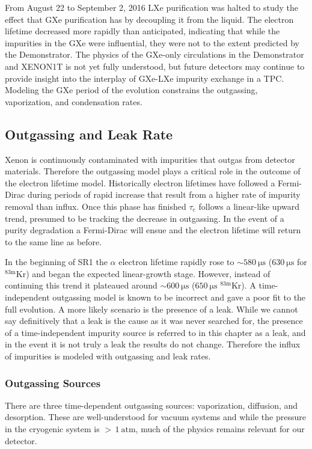From August 22 to September 2, 2016 LXe purification was halted to study the effect that GXe purification has by
decoupling it from the liquid.  The electron lifetime decreased more rapidly than anticipated, indicating that while the
impurities in the GXe were influential, they were not to the extent predicted by the Demonstrator.  The physics of the GXe-only
circulations in the Demonstrator and XENON1T is not yet fully understood, but future detectors may continue to provide insight into
the interplay of GXe-LXe impurity exchange in a TPC.  Modeling the GXe period of the evolution constrains the outgassing,
vaporization, and condensation rates.



\subsection{Outgassing and Leak Rate}
\label{subsec:electron_lifetime_model_outgassing}
Xenon is continuously contaminated with impurities that outgas from detector materials.  Therefore the outgassing model plays a
critical role in the outcome of the electron lifetime model.  Historically electron lifetimes have followed a Fermi-Dirac during periods
of rapid increase that result from a higher rate of impurity removal than influx.  Once this phase has
finished $\tau_e$ follows a linear-like upward trend, presumed to be tracking the decrease in outgassing.  In the event of a
purity degradation a Fermi-Dirac will ensue and the electron lifetime will return to the same line as before.

In the beginning of SR1 the $\alpha$ electron lifetime rapidly rose to ${\sim} 580\ \mathrm{\mu s}$ ($630\ \mathrm{\mu s}$ for
$\mathrm{^{83m}Kr}$) and began the expected linear-growth stage.  However, instead of continuing this trend
it plateaued around ${\sim} 600\ \mathrm{\mu s}$ ($650\ \mathrm{\mu s}$ $\mathrm{^{83m}Kr}$).  A time-independent outgassing model is
known to be incorrect and
gave a poor fit to the full evolution.  A more likely scenario is the presence of a leak.  While we cannot say definitively that a leak
is the cause as it was never searched for, the presence of a time-independent impurity source is referred to in this chapter as a
leak, and in the event it is not truly a leak the results do not change.  Therefore the influx of impurities is modeled with
outgassing and leak rates.



\subsubsection{Outgassing Sources}
\label{subsubsec:electron_lifetime_model_outgassing_sources}
There are three time-dependent outgassing sources: vaporization, diffusion, and desorption.  These are well-understood for vacuum systems
and while the pressure in the cryogenic system is ${>}\, 1\ \mathrm{atm}$, much of the physics remains relevant for our detector.

